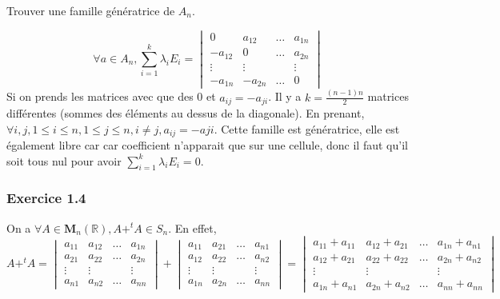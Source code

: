 \documentclass[]{book}
\theoremstyle{definition}
\newcommand{\bb}[1]{\mathbb{#1}}
\newcommand{\R}{\bb{R}}
\newcommand{\M}{\mathbf{M}}
\begin{document}
 

Trouver une famille g\'en\'eratrice de $A_n$.
	
$$
\forall a \in A_n,
\sum_{i=1}^{k}\lambda_i E_{i} =  
\begin{vmatrix} 0 & a_{12} & \ldots & a_{1n} \\ -a_{12} & 0 & \ldots & a_{2n} \\ \vdots & \vdots & & \vdots \\ -a_{1n} & -a_{2n} & \ldots & 0 \end{vmatrix}
$$
Si on prends les matrices avec que des 0 et $a_{ij} = - a_{ji}$. Il y a $k=\frac{(n-1)n}{2}$ matrices diff\'erentes (sommes des \'el\'ements au dessus de la diagonale). En prenant, $\forall i, j, 1 \leq i \leq n, 1 \leq j \leq n, i \neq j, a_{ij}=-a{ji}$.
Cette famille est g\'en\'eratrice, elle est \'egalement libre car car coefficient n'apparait que sur une cellule, donc il faut qu'il soit tous nul pour avoir $\sum_{i=1}^{k}\lambda_i E_{i} =  0$.
 

\subsubsection*{Exercice 1.4}
On a $\forall A \in \M_n(\R), A+^{t}A \in S_n$. En effet,
$$
A + ^{t}A = 
\begin{vmatrix} a_{11} & a_{12} & \ldots & a_{1n} \\ a_{21} & a_{22} & \ldots & a_{2n} \\ \vdots & \vdots & & \vdots \\ a_{n1} & a_{n2} & \ldots & a_{nn} \end{vmatrix} +
\begin{vmatrix} a_{11} & a_{21} & \ldots & a_{n1} \\ a_{12} & a_{22} & \ldots & a_{n2} \\ \vdots & \vdots & & \vdots \\ a_{1n} & a_{2n} & \ldots & a_{nn} \end{vmatrix} =
\begin{vmatrix} a_{11} + a_{11} & a_{12} + a_{21} & \ldots & a_{1n} + a_{n1} \\ a_{12} + a_{21} & a_{22} + a_{22} & \ldots & a_{2n} + a_{n2} \\ \vdots & \vdots & & \vdots \\ a_{1n} + a_{n1}& a_{2n} + a_{n2}& \ldots & a_{nn} + a_{nn} \end{vmatrix}
$$
\end{document}
